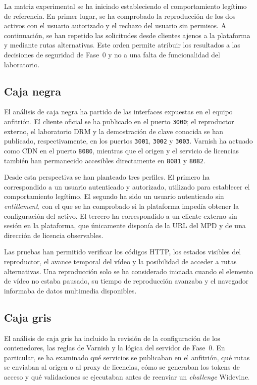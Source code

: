 La matriz experimental se ha iniciado estableciendo el comportamiento legítimo de referencia. En primer lugar, se ha comprobado la reproducción de los dos activos con el usuario autorizado y el rechazo del usuario sin permisos. A continuación, se han repetido las solicitudes desde clientes ajenos a la plataforma y mediante rutas alternativas. Este orden permite atribuir los resultados a las decisiones de seguridad de Fase~0 y no a una falta de funcionalidad del laboratorio.

\subsection{Caja negra}

El análisis de caja negra ha partido de las interfaces expuestas en el equipo anfitrión. El cliente oficial se ha publicado en el puerto \nolinkurl{3000}; el reproductor externo, el laboratorio DRM y la demostración de clave conocida se han publicado, respectivamente, en los puertos \nolinkurl{3001}, \nolinkurl{3002} y \nolinkurl{3003}. Varnish ha actuado como CDN en el puerto \nolinkurl{8080}, mientras que el origen y el servicio de licencias también han permanecido accesibles directamente en \nolinkurl{8081} y \nolinkurl{8082}.

Desde esta perspectiva se han planteado tres perfiles. El primero ha correspondido a un usuario autenticado y autorizado, utilizado para establecer el comportamiento legítimo. El segundo ha sido un usuario autenticado sin \textit{entitlement}, con el que se ha comprobado si la plataforma impedía obtener la configuración del activo. El tercero ha correspondido a un cliente externo sin sesión en la plataforma, que únicamente disponía de la URL del MPD y de una dirección de licencia observables.

Las pruebas han permitido verificar los códigos HTTP, los estados visibles del reproductor, el avance temporal del vídeo y la posibilidad de acceder a rutas alternativas. Una reproducción solo se ha considerado iniciada cuando el elemento de vídeo no estaba pausado, su tiempo de reproducción avanzaba y el navegador informaba de datos multimedia disponibles.

\subsection{Caja gris}

El análisis de caja gris ha incluido la revisión de la configuración de los contenedores, las reglas de Varnish y la lógica del servidor de Fase~0. En particular, se ha examinado qué servicios se publicaban en el anfitrión, qué rutas se enviaban al origen o al proxy de licencias, cómo se generaban los tokens de acceso y qué validaciones se ejecutaban antes de reenviar un \textit{challenge} Widevine.

